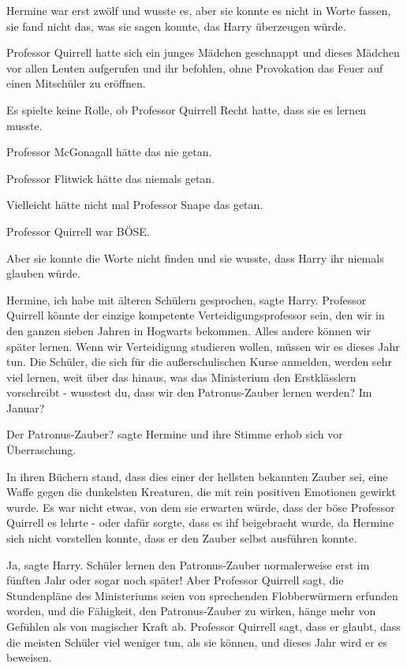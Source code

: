 Hermine war erst zwölf und wusste es, aber sie konnte es nicht in Worte fassen,
sie fand nicht das, was sie sagen konnte, das Harry überzeugen würde.

Professor Quirrell hatte sich ein junges Mädchen geschnappt und dieses Mädchen
vor allen Leuten aufgerufen und ihr befohlen, ohne Provokation das Feuer auf
einen Mitschüler zu eröffnen.

Es spielte keine Rolle, ob Professor Quirrell Recht hatte, dass sie es lernen
musste.

Professor McGonagall hätte das nie getan.

Professor Flitwick hätte das niemals getan.

Vielleicht hätte nicht mal Professor Snape das getan.

Professor Quirrell war BÖSE.

Aber sie konnte die Worte nicht finden und sie wusste, dass Harry ihr niemals
glauben würde.

\glqq{}Hermine, ich habe mit älteren Schülern gesprochen\grqq{}, sagte Harry.
\glqq{}Professor Quirrell könnte der einzige kompetente Verteidigungsprofessor
sein, den wir in den ganzen sieben Jahren in Hogwarts bekommen. Alles andere
können wir später lernen. Wenn wir Verteidigung studieren wollen, müssen wir es
dieses Jahr tun. Die Schüler, die sich für die außerschulischen Kurse anmelden,
werden sehr viel lernen, weit über das hinaus, was das Ministerium den
Erstklässlern vorschreibt - wusstest du, dass wir den Patronus-Zauber lernen
werden? Im Januar?\grqq{}

\glqq{}Der Patronus-Zauber?\grqq{} sagte Hermine und ihre Stimme erhob sich vor
Überraschung.

In ihren Büchern stand, dass dies einer der hellsten bekannten Zauber sei, eine
Waffe gegen die dunkelsten Kreaturen, die mit rein positiven Emotionen gewirkt
wurde. Es war nicht etwas, von dem sie erwarten würde, dass der böse Professor
Quirrell es lehrte - oder dafür sorgte, dass es ihf beigebracht wurde, da
Hermine sich nicht vorstellen konnte, dass er den Zauber selbst ausführen
konnte.

\glqq{}Ja\grqq{}, sagte Harry. \glqq{}Schüler lernen den Patronus-Zauber
normalerweise erst im fünften Jahr oder sogar noch später! Aber Professor
Quirrell sagt, die Stundenpläne des Ministeriums seien von sprechenden
Flobberwürmern erfunden worden, und die Fähigkeit, den Patronus-Zauber zu
wirken, hänge mehr von Gefühlen als von magischer Kraft ab. Professor Quirrell
sagt, dass er glaubt, dass die meisten Schüler viel weniger tun, als sie können,
und dieses Jahr wird er es beweisen.\grqq{}

